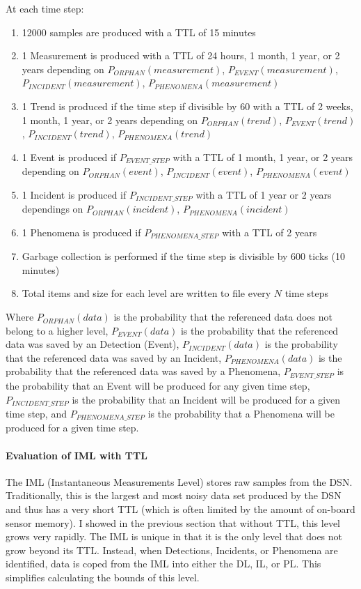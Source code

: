 At each time step:
\begin{enumerate}
	\item 12000 samples are produced with a TTL of 15 minutes
	\item 1 Measurement is produced with a TTL of 24 hours, 1 month, 1 year, or 2 years depending on $P_{ORPHAN}(measurement)$, $P_{EVENT}(measurement)$, $P_{INCIDENT}(measurement)$, $P_{PHENOMENA}(measurement)$
	\item 1 Trend is produced if the time step if divisible by 60 with a TTL of 2 weeks, 1 month, 1 year, or 2 years depending on $P_{ORPHAN}(trend)$, $P_{EVENT}(trend)$, $P_{INCIDENT}(trend)$, $P_{PHENOMENA}(trend)$
	\item 1 Event is produced if $P_{EVENT\_STEP}$ with a TTL of 1 month, 1 year, or 2 years depending on $P_{ORPHAN}(event)$, $P_{INCIDENT}(event)$, $P_{PHENOMENA}(event)$
	\item 1 Incident is produced if $P_{INCIDENT\_STEP}$ with a TTL of 1 year or 2 years dependings on $P_{ORPHAN}(incident)$, $P_{PHENOMENA}(incident)$
	\item 1 Phenomena is produced if $P_{PHENOMENA\_STEP}$ with a TTL of 2 years
	\item Garbage collection is performed if the time step is divisible by 600 ticks (10 minutes)
	\item Total items and size for each level are written to file every $N$ time steps
\end{enumerate}

Where $P_{ORPHAN}(data)$ is the probability that the referenced data does not belong to a higher level, $P_{EVENT}(data)$ is the probability that the referenced data was saved by an Detection (Event), $P_{INCIDENT}(data)$ is the probability that the referenced data was saved by an Incident, $P_{PHENOMENA}(data)$ is the probability that the referenced data was saved by a Phenomena, $P_{EVENT\_STEP}$ is the probability that an Event will be produced for any given time step, $P_{INCIDENT\_STEP}$ is the probability that an Incident will be produced for a given time step, and $P_{PHENOMENA\_STEP}$ is the probability that a Phenomena will be produced for a given time step.

\paragraph{Evaluation of IML with TTL}
The IML (Instantaneous Measurements Level) stores raw samples from the DSN. Traditionally, this is the largest and most noisy data set produced by the DSN and thus has a very short TTL (which is often limited by the amount of on-board sensor memory). I showed in the previous section that without TTL, this level grows very rapidly. The IML is unique in that it is the only level that does not grow beyond its TTL. Instead, when Detections, Incidents, or Phenomena are identified, data is coped from the IML into either the DL, IL, or PL. This simplifies calculating the bounds of this level.

